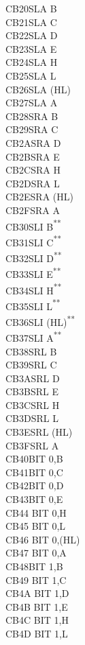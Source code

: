 \documentclass[12pt,twoside,openright,a4paper]{book}
\newcommand{\UNDOC}{\textnormal{\textsuperscript{**}}}
\begin{document}
\begin{multicols}{3}
{\begin{tabbing}
	CB20\>SLA B\\
	CB21\>SLA C\\
	CB22\>SLA D\\
	CB23\>SLA E\\
	CB24\>SLA H\\
	CB25\>SLA L\\
	CB26\>SLA (HL)\\
	CB27\>SLA A\\
	CB28\>SRA B\\
	CB29\>SRA C\\
	CB2A\>SRA D\\
	CB2B\>SRA E\\
	CB2C\>SRA H\\
	CB2D\>SRA L\\
	CB2E\>SRA (HL)\\
	CB2F\>SRA A\\
	CB30\>SLI B\UNDOC\\
	CB31\>SLI C\UNDOC\\
	CB32\>SLI D\UNDOC\\
	CB33\>SLI E\UNDOC\\
	CB34\>SLI H\UNDOC\\
	CB35\>SLI L\UNDOC\\
	CB36\>SLI (HL)\UNDOC\\
	CB37\>SLI A\UNDOC\\
	CB38\>SRL B\\
	CB39\>SRL C\\
	CB3A\>SRL D\\
	CB3B\>SRL E\\
	CB3C\>SRL H\\
	CB3D\>SRL L\\
	CB3E\>SRL (HL)\\
	CB3F\>SRL A\\
	CB40\>BIT 0,B\\
	CB41\>BIT 0,C\\
	CB42\>BIT 0,D\\
	CB43\>BIT 0,E\\
	CB44\> 	BIT 0,H\\
	CB45\> 	BIT 0,L\\
	CB46\> 	BIT 0,(HL)\\
	CB47\> 	BIT 0,A\\
	CB48\>BIT 1,B\\
	CB49\> 	BIT 1,C\\
	CB4A\> 	BIT 1,D\\
	CB4B\> 	BIT 1,E\\
	CB4C\> 	BIT 1,H\\
	CB4D\> 	BIT 1,L\\

\end{tabbing}}
\end{multicols}
\end{document}
